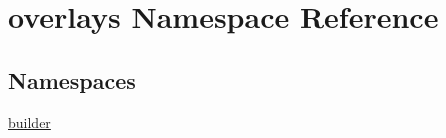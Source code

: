 \hypertarget{namespaceoverlays}{}\section{overlays Namespace Reference}
\label{namespaceoverlays}
\subsection*{Namespaces}
\begin{DoxyCompactItemize}
\item 
 \hyperlink{namespaceoverlays_1_1builder}{builder}
\end{DoxyCompactItemize}

